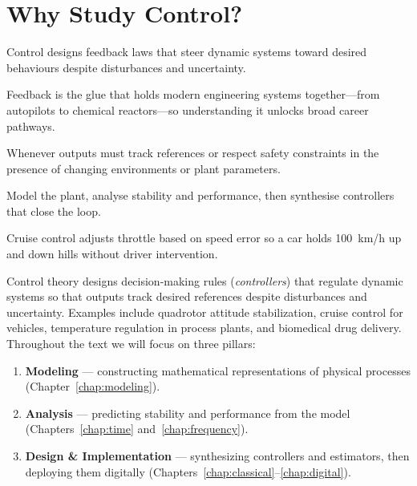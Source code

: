 \section{Why Study Control?}
\begin{beginnerguide}
    \item[\textbf{What?}] Control designs feedback laws that steer dynamic systems toward desired behaviours despite disturbances and uncertainty.
    \item[\textbf{Why?}] Feedback is the glue that holds modern engineering systems together—from autopilots to chemical reactors—so understanding it unlocks broad career pathways.
    \item[\textbf{When?}] Whenever outputs must track references or respect safety constraints in the presence of changing environments or plant parameters.
    \item[\textbf{How?}] Model the plant, analyse stability and performance, then synthesise controllers that close the loop.
    \item[\textbf{Example}] Cruise control adjusts throttle based on speed error so a car holds \SI{100}{km/h} up and down hills without driver intervention.
\end{beginnerguide}
Control theory designs decision-making rules (\emph{controllers}) that regulate dynamic systems so that outputs track desired references despite disturbances and uncertainty. Examples include quadrotor attitude stabilization, cruise control for vehicles, temperature regulation in process plants, and biomedical drug delivery. Throughout the text we will focus on three pillars:
\begin{enumerate}[leftmargin=*]
    \item \textbf{Modeling} --- constructing mathematical representations of physical processes (Chapter~\ref{chap:modeling}).
    \item \textbf{Analysis} --- predicting stability and performance from the model (Chapters~\ref{chap:time} and~\ref{chap:frequency}).
    \item \textbf{Design \& Implementation} --- synthesizing controllers and estimators, then deploying them digitally (Chapters~\ref{chap:classical}--\ref{chap:digital}).
\end{enumerate}

